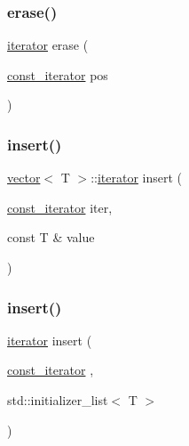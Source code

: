\subsubsection{\texorpdfstring{erase()}{erase()}}
{\footnotesize\ttfamily \mbox{\hyperlink{classvector_a35c955cacac6aacaa1e82874b1628865}{iterator}} erase (\begin{DoxyParamCaption}\item[{\mbox{\hyperlink{classvector_a2fc97dce62b7053449cc868607540dba}{const\+\_\+iterator}}}]{pos }\end{DoxyParamCaption})}

\mbox{\label{classvector_abaccf57fd8aee4b5397e00e7cb4702c4}} 
\subsubsection{\texorpdfstring{insert()}{insert()}\hspace{0.1cm}{\footnotesize\ttfamily [1/2]}}
{\footnotesize\ttfamily \mbox{\hyperlink{classvector}{vector}}$<$ T $>$\+::\mbox{\hyperlink{classvector_a35c955cacac6aacaa1e82874b1628865}{iterator}} insert (\begin{DoxyParamCaption}\item[{\mbox{\hyperlink{classvector_a2fc97dce62b7053449cc868607540dba}{const\+\_\+iterator}}}]{iter,  }\item[{const T \&}]{value }\end{DoxyParamCaption})}

\mbox{\label{classvector_a5e06aa6a068907bcf3ea202a6ae96c1c}} 
\subsubsection{\texorpdfstring{insert()}{insert()}\hspace{0.1cm}{\footnotesize\ttfamily [2/2]}}
{\footnotesize\ttfamily \mbox{\hyperlink{classvector_a35c955cacac6aacaa1e82874b1628865}{iterator}} insert (\begin{DoxyParamCaption}\item[{\mbox{\hyperlink{classvector_a2fc97dce62b7053449cc868607540dba}{const\+\_\+iterator}}}]{,  }\item[{std\+::initializer\+\_\+list$<$ T $>$}]{ }\end{DoxyParamCaption})}

